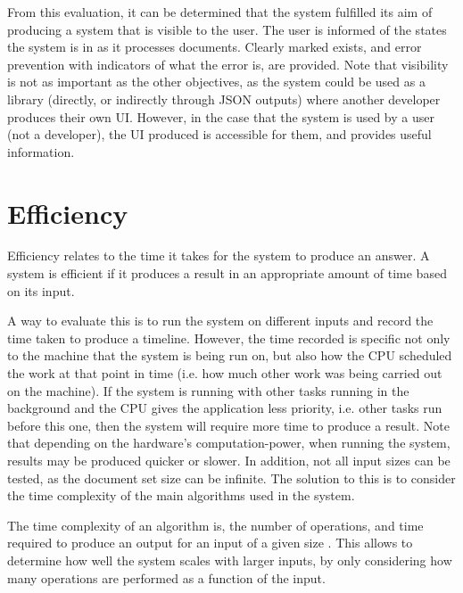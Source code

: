 \par From this evaluation, it can be determined that the system fulfilled its aim of producing a system that is visible to the user. The user is informed of the states the system is in as it processes documents. Clearly marked exists, and error prevention with indicators of what the error is, are provided. Note that visibility is not as important as the other objectives, as the system could be used as a library (directly, or indirectly through JSON outputs) where another developer produces their own UI. However, in the case that the system is used by a user (not a developer), the UI produced is accessible for them, and provides useful information.

\section{Efficiency}
\par Efficiency relates to the time it takes for the system to produce an answer. A system is efficient if it produces a result in an appropriate amount of time based on its input.

\par A way to evaluate this is to run the system on different inputs and record the time taken to produce a timeline. However, the time recorded is specific not only to the machine that the system is being run on, but also how the CPU scheduled the work at that point in time (i.e. how much other work was being carried out on the machine). If the system is running with other tasks running in the background and the CPU gives the application less priority, i.e. other tasks run before this one, then the system will require more time to produce a result. Note that depending on the hardware's computation-power, when running the system, results may be produced quicker or slower. In addition, not all input sizes can be tested, as the document set size can be infinite. The solution to this is to consider the time complexity of the main algorithms used in the system. 

\par The time complexity of an algorithm is, the number of operations, and time required to produce an output for an input of a given size \cite{sipser2012}. This allows to determine how well the system scales with larger inputs, by only considering how many operations are performed as a function of the input.

